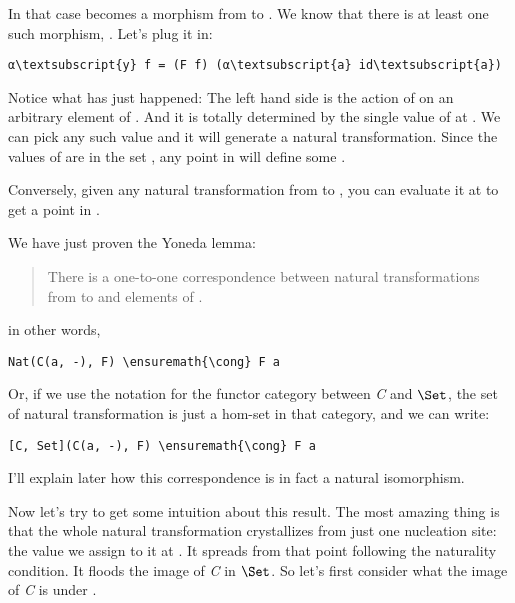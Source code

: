 \noindent
In that case  becomes a morphism from  to
. We know that there is at least one such morphism,
. Let's plug it in:

\begin{Verbatim}[commandchars=\\\{\}]
α\textsubscript{y} f = (F f) (α\textsubscript{a} id\textsubscript{a})
\end{Verbatim}
Notice what has just happened: The left hand side is the action of
 on an arbitrary element  of . And
it is totally determined by the single value of  at
. We can pick any such value and it will generate a natural
transformation. Since the values of  are in the set
, any point in  will define some .

Conversely, given any natural transformation  from
 to , you can evaluate it at  to
get a point in .

We have just proven the Yoneda lemma:

\begin{quote}
There is a one-to-one correspondence between natural transformations
from  to  and elements of . 
\end{quote}
in other words,


\begin{Verbatim}[commandchars=\\\{\}]
Nat(C(a, -), F) \ensuremath{\cong} F a
\end{Verbatim}
Or, if we use the notation \code{{[}C, Set{]}} for the functor
category between \emph{C} and $\Set$, the set of natural
transformation is just a hom-set in that category, and we can write:

\begin{Verbatim}[commandchars=\\\{\}]
[C, Set](C(a, -), F) \ensuremath{\cong} F a
\end{Verbatim}
I'll explain later how this correspondence is in fact a natural
isomorphism.

Now let's try to get some intuition about this result. The most amazing
thing is that the whole natural transformation crystallizes from just
one nucleation site: the value we assign to it at . It
spreads from that point following the naturality condition. It floods
the image of \emph{C} in $\Set$. So let's first consider what the
image of \emph{C} is under .

